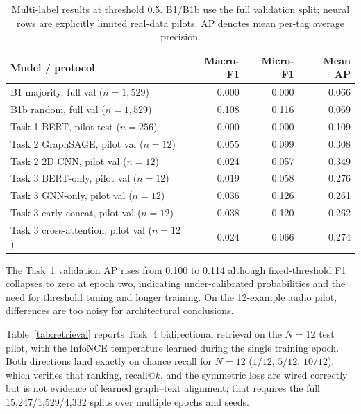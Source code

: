 \documentclass{article}
\begin{document}
\begin{table}[t]
  \caption{Multi-label results at threshold 0.5. B1/B1b use the full validation split; neural rows are explicitly limited real-data pilots. AP denotes mean per-tag average precision.}
  \label{tab:results}
  \centering
  \begin{tabular}{lrrr}
    \toprule
    Model / protocol & Macro-F1 & Micro-F1 & Mean AP \\
    \midrule
    B1 majority, full val ($n{=}1{,}529$) & 0.000 & 0.000 & 0.066 \\
    B1b random, full val ($n{=}1{,}529$) & 0.108 & 0.116 & 0.069 \\
    \midrule
    Task 1 BERT, pilot test ($n{=}256$) & 0.000 & 0.000 & 0.109 \\
    \midrule
    Task 2 GraphSAGE, pilot val ($n{=}12$) & 0.055 & 0.099 & 0.308 \\
    Task 2 2D CNN, pilot val ($n{=}12$) & 0.024 & 0.057 & 0.349 \\
    \midrule
    Task 3 BERT-only, pilot val ($n{=}12$) & 0.019 & 0.058 & 0.276 \\
    Task 3 GNN-only, pilot val ($n{=}12$) & 0.036 & 0.126 & 0.261 \\
    Task 3 early concat, pilot val ($n{=}12$) & 0.038 & 0.120 & 0.262 \\
    Task 3 cross-attention, pilot val ($n{=}12$) & 0.024 & 0.066 & 0.274 \\
    \bottomrule
  \end{tabular}
\end{table}

The Task~1 validation AP rises from 0.100 to 0.114 although fixed-threshold
F1 collapses to zero at epoch two, indicating under-calibrated probabilities
and the need for threshold tuning and longer training. On the 12-example
audio pilot, differences are too noisy for architectural conclusions.

Table~\ref{tab:retrieval} reports Task~4 bidirectional retrieval on the
$N{=}12$ test pilot, with the InfoNCE temperature learned during the
single training epoch. Both directions land exactly on chance recall for
$N=12$ ($1/12$, $5/12$, $10/12$), which verifies that ranking, recall@$k$,
and the symmetric loss are wired correctly but is not evidence of learned
graph--text alignment; that requires the full 15{,}247/1{,}529/4{,}332
splits over multiple epochs and seeds.
\end{document}
